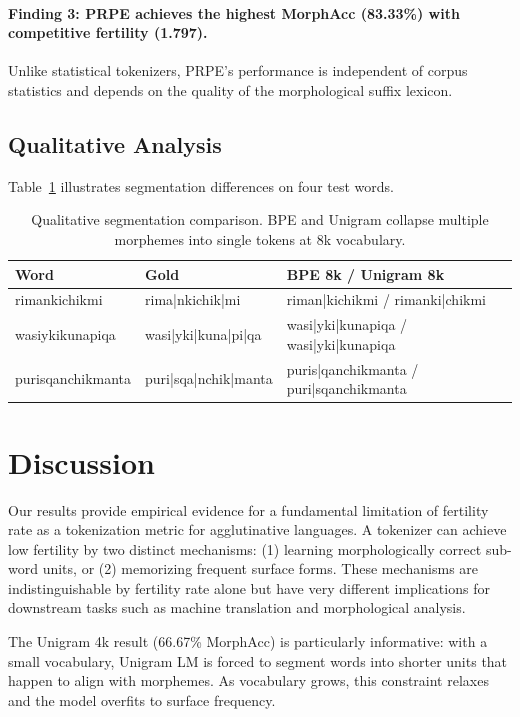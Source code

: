 \documentclass[11pt]{article}
\begin{document}
\paragraph{Finding 3: PRPE achieves the highest MorphAcc (83.33\%) with competitive fertility (1.797).} Unlike statistical tokenizers, PRPE's performance is independent of corpus statistics and depends on the quality of the morphological suffix lexicon.

\subsection{Qualitative Analysis}

Table~\ref{tab:qualitative} illustrates segmentation differences on four test words.

\begin{table}[h]
\centering
\small
\begin{tabular}{p{2cm}p{2cm}p{3.5cm}}
\toprule
\textbf{Word} & \textbf{Gold} & \textbf{BPE 8k / Unigram 8k} \\
\midrule
rimankichikmi & rima|nkichik|mi & riman|kichikmi / rimanki|chikmi \\
wasiykikunapiqa & wasi|yki|kuna|pi|qa & wasi|yki|kunapiqa / wasi|yki|kunapiqa \\
purisqanchikmanta & puri|sqa|nchik|manta & puris|qanchikmanta / puri|sqanchikmanta \\
\bottomrule
\end{tabular}
\caption{Qualitative segmentation comparison. BPE and Unigram collapse multiple morphemes into single tokens at 8k vocabulary.}
\label{tab:qualitative}
\end{table}

\section{Discussion}

Our results provide empirical evidence for a fundamental limitation of fertility rate as a tokenization metric for agglutinative languages. A tokenizer can achieve low fertility by two distinct mechanisms: (1) learning morphologically correct sub-word units, or (2) memorizing frequent surface forms. These mechanisms are indistinguishable by fertility rate alone but have very different implications for downstream tasks such as machine translation and morphological analysis.

The Unigram 4k result (66.67\% MorphAcc) is particularly informative: with a small vocabulary, Unigram LM is forced to segment words into shorter units that happen to align with morphemes. As vocabulary grows, this constraint relaxes and the model overfits to surface frequency.
\end{document}
